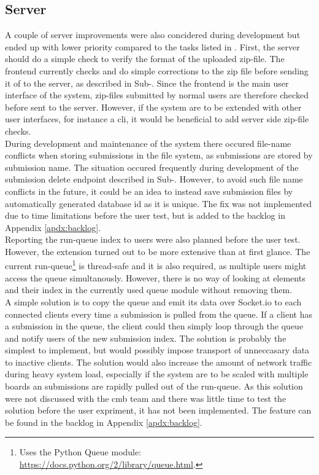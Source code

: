 \subsection{Server}
A couple of server improvements were also concidered during development but ended up with lower priority compared to the tasks listed in . First, the server should do a simple check to verify the format of the uploaded zip-file. The frontend currently checks and do simple corrections to the zip file before sending it of to the server, as described in Sub-. Since the frontend is the main user interface of the system, zip-files submitted by normal users are therefore checked before sent to the server. However, if the system are to be extended with other user interfaces, for instance a \gls{cli}, it would be beneficial to add server side zip-file checks. \\

During development and maintenance of the system there occured file-name conflicts when storing submissions in the file system, as submissions are stored by submission name. The situation occured frequently during development of the submission delete endpoint described in Sub-. However, to avoid such file name conflicts in the future, it could be an idea to instead save submission files by automatically generated database id as it is unique. The fix was not implemented due to time limitations before the user test, but is added to the backlog in Appendix \ref{apdx:backlog}. \\

Reporting the run-queue index to users were also planned before the user test. However, the extension turned out to be more extensive than at first glance. The current run-queue\footnote{Uses the Python Queue module: \url{https://docs.python.org/2/library/queue.html}.} is thread-safe and it is also required, as multiple users might access the queue simultanously. However, there is no way of looking at elements and their index in the currently used queue module without removing them.  \\

A simple solution is to copy the queue and emit its data over Socket.io to each connected clients every time a submission is pulled from the queue. If a client has a submission in the queue, the client could then simply loop through the queue and notify users of the new submission index. The solution is probably the simplest to implement, but would possibly impose transport of unneccasary data to inactive clients. The solution would also increase the amount of network traffic during heavy system load, especially if the system are to be scaled with multiple boards an submissions are rapidly pulled out of the run-queue. As this solution were not discussed with the \gls{cmb} team and there was little time to test the solution before the user expriment, it has not been implemented. The feature can be found in the backlog in Appendix \ref{apdx:backlog}. \\

